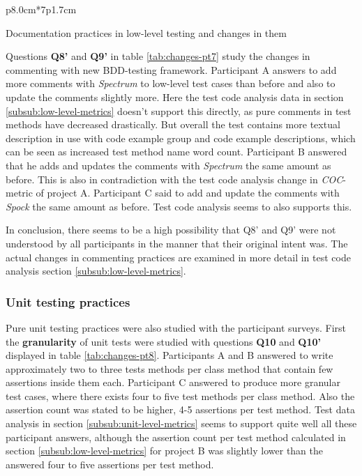 \begin{table}[H]
{\begin{tttabular}{p{8.0cm}*{7}{p{1.7cm}}}
            \end{tttabular}}
            \caption {Documentation practices in low-level testing and changes in them} \label{tab:changes-pt7}
    \end{table}

Questions \textbf{Q8'} and \textbf{Q9'} in table \ref{tab:changes-pt7} study the changes in commenting with new BDD-testing framework.
Participant A answers to add more comments with \textit{Spectrum} to low-level test cases
than before and also to update the comments slightly more.
Here the test code analysis data in section \ref{subsub:low-level-metrics} doesn't support this directly, as pure comments
in test methods have decreased drastically. But overall
the test contains more textual description in use with code example group and code example descriptions, which can be seen
as increased test method name word count. Participant B answered that he adds and updates the comments with \textit{Spectrum} the same amount as before.
This is also in contradiction with the test code analysis change in \textit{COC}-metric of project A. Participant C said to add and
update the comments with \textit{Spock} the same amount as before. Test code analysis seems to also supports this.

In conclusion, there seems to be a high possibility
that Q8' and Q9' were not understood by all participants in the manner that their original intent was. The actual changes
in commenting practices are examined in more detail in test code analysis section \ref{subsub:low-level-metrics}.

\subsubsection{Unit testing practices}
Pure unit testing practices were also studied with the participant surveys. First the \textbf{granularity} of unit tests were
studied with questions \textbf{Q10} and \textbf{Q10'} displayed in table \ref{tab:changes-pt8}. Participants A and B answered
to write approximately two to three tests methods per class method that contain few assertions inside them each. Participant
C answered to produce more granular test cases, where there exists four to five test methods per class method.
Also the assertion count was stated to be higher, 4-5 assertions per test method. Test data analysis in section \ref{subsub:unit-level-metrics}
seems to support quite well all these participant answers, although the assertion count per test method calculated in section \ref{subsub:low-level-metrics}
for project B was slightly lower than the answered four to five assertions per test method.

